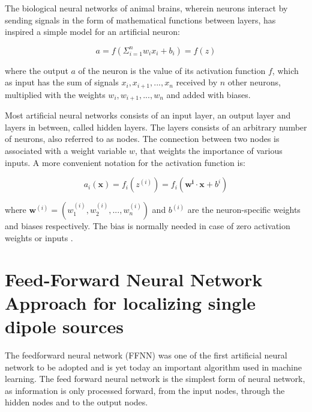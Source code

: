 \documentclass[a4paper, UKenglish, 11pt]{uiomaster}
\begin{document}
The biological neural networks of animal brains, wherein neurons interact by sending signals in the form of mathematical functions between layers, has inspired a simple model for an artificial neuron:

\begin{equation}
    a = f \left( \Sigma_{i=1}^n w_ix_i + b_i\right ) = f(z)
    \label{eq:NN}
\end{equation}

where the output $a$ of the neuron is the value of its activation function $f$, which as input has the sum of signals $x_i, x_{i+1}, ..., x_n$ received by $n$ other neurons, multiplied with the weights $w_i, w_{i+1}, ..., w_n$ and added with biases.

Most artificial neural networks consists of an input layer, an output layer and layers in between, called hidden layers. The layers consists of an arbitrary number of neurons, also referred to as nodes. The connection between two nodes is associated with a weight variable $w$, that weights the importance of various inputs. A more convenient notation for the activation function is:

\begin{equation}
    a_i(\boldsymbol{x}) = f_i(z^{(i)}) = f_i(\boldsymbol{w^{i}}\cdot \boldsymbol{x} + b^{i})
\label{eq:NN_vec}
\end{equation}

where $\boldsymbol{w}^{(i)} = (w_1^{(i)}, w_2^{(i)}, ..., w_n^{(i)})$ and $b^{(i)}$ are the neuron-specific weights and biases respectively. The bias is normally needed in case of zero activation weights or inputs \cite{101}.

\section{Feed-Forward Neural Network Approach for localizing single dipole sources}
The feedforward neural network (FFNN) was one of the first artificial neural network to be adopted and is yet today an important algorithm used in machine learning. The feed forward neural network is the simplest form of neural network, as information is only processed forward, from the input nodes, through the hidden nodes and to the output nodes.
\end{document}
